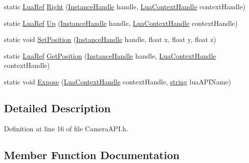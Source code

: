 \begin{DoxyCompactItemize}
\item 
static \hyperlink{_lua_context_8h_a2220f03700ba40e366f0ee2d684d5c91}{Lua\+Ref} \hyperlink{class_camera_a_p_i_aa5880fe8e2c06187a7c2d51eeb84000d}{Right} (\hyperlink{_lua_object_instance_manager_8h_a317edebd09c13058779c942342947a0d}{Instance\+Handle} handle, \hyperlink{_lua_context_8h_a2ffcc2d3ed21165072a1d7b61259bf14}{Lua\+Context\+Handle} context\+Handle)
\item 
static \hyperlink{_lua_context_8h_a2220f03700ba40e366f0ee2d684d5c91}{Lua\+Ref} \hyperlink{class_camera_a_p_i_a9a81c7e6b39f97aeacbdaa6d235bfca9}{Up} (\hyperlink{_lua_object_instance_manager_8h_a317edebd09c13058779c942342947a0d}{Instance\+Handle} handle, \hyperlink{_lua_context_8h_a2ffcc2d3ed21165072a1d7b61259bf14}{Lua\+Context\+Handle} context\+Handle)
\item 
static void \hyperlink{class_camera_a_p_i_a16c6a60e8eb4fa6101296580054ac8d8}{Set\+Position} (\hyperlink{_lua_object_instance_manager_8h_a317edebd09c13058779c942342947a0d}{Instance\+Handle} handle, float x, float y, float z)
\item 
static \hyperlink{_lua_context_8h_a2220f03700ba40e366f0ee2d684d5c91}{Lua\+Ref} \hyperlink{class_camera_a_p_i_afac8d27833315d0a92906f9024f9c669}{Get\+Position} (\hyperlink{_lua_object_instance_manager_8h_a317edebd09c13058779c942342947a0d}{Instance\+Handle} handle, \hyperlink{_lua_context_8h_a2ffcc2d3ed21165072a1d7b61259bf14}{Lua\+Context\+Handle} context\+Handle)
\item 
static void \hyperlink{class_camera_a_p_i_aaf662d03b6128012dfac8fbdddcb8ba8}{Expose} (\hyperlink{_lua_context_8h_a2ffcc2d3ed21165072a1d7b61259bf14}{Lua\+Context\+Handle} context\+Handle, \hyperlink{_types_8h_ad453f9f71ce1f9153fb748d6bb25e454}{string} lua\+A\+P\+I\+Name)
\end{DoxyCompactItemize}


\subsection{Detailed Description}


Definition at line 16 of file Camera\+A\+P\+I.\+h.



\subsection{Member Function Documentation}
